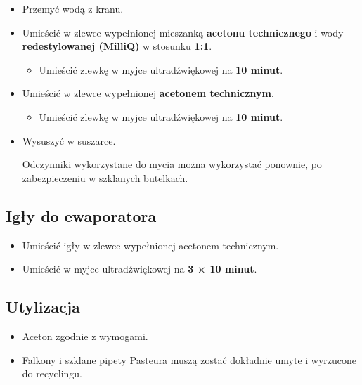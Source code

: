 \documentclass[
  letterpaper,
  DIV=11,
  numbers=noendperiod]{scrreprt}
\providecommand{\tightlist}{%
  \setlength{\itemsep}{0pt}\setlength{\parskip}{0pt}}\usepackage{longtable,booktabs,array}
\begin{document}
\begin{itemize}
\item
  Przemyć wodą z kranu.
\item
  Umieścić w zlewce wypełnionej mieszanką \textbf{acetonu technicznego}
  i wody \textbf{redestylowanej (MilliQ)} w stosunku \textbf{1:1}.

  \begin{itemize}
  \tightlist
  \item
    Umieścić zlewkę w myjce ultradźwiękowej na \textbf{10 minut}.
  \end{itemize}
\item
  Umieścić w zlewce wypełnionej \textbf{acetonem technicznym}.

  \begin{itemize}
  \tightlist
  \item
    Umieścić zlewkę w myjce ultradźwiękowej na \textbf{10 minut}.
  \end{itemize}
\item
  Wysuszyć w suszarce.

  Odczynniki wykorzystane do mycia można wykorzystać ponownie, po
  zabezpieczeniu w szklanych butelkach.
\end{itemize}

\hypertarget{sec-igux142y-do-ewaporatora}{%
\subsection{Igły do ewaporatora}\label{sec-igux142y-do-ewaporatora}}

\begin{itemize}
\item
  Umieścić igły w zlewce wypełnionej acetonem technicznym.
\item
  Umieścić w myjce ultradźwiękowej na \textbf{3 × 10 minut}.
\end{itemize}

\hypertarget{utylizacja}{%
\subsection{Utylizacja}\label{utylizacja}}

\begin{itemize}
\item
  Aceton zgodnie z wymogami.
\item
  Falkony i szklane pipety Pasteura muszą zostać dokładnie umyte i
  wyrzucone do recyclingu.
\end{itemize}
\end{document}
